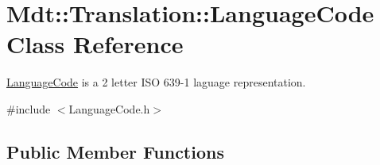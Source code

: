 \hypertarget{class_mdt_1_1_translation_1_1_language_code}{}\section{Mdt\+:\+:Translation\+:\+:Language\+Code Class Reference}
\label{class_mdt_1_1_translation_1_1_language_code}


\hyperlink{class_mdt_1_1_translation_1_1_language_code}{Language\+Code} is a 2 letter I\+SO 639-\/1 laguage representation.  




{\ttfamily \#include $<$Language\+Code.\+h$>$}

\subsection*{Public Member Functions}
